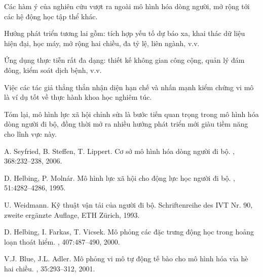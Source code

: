 \documentclass[12pt,a4paper]{article}
\begin{document}
Các hàm ý của nghiên cứu vượt ra ngoài mô hình hóa dòng người, mở rộng tới các hệ động học tập thể khác.

Hướng phát triển tương lai gồm: tích hợp yếu tố dự báo xa, khai thác dữ liệu hiện đại, học máy, mở rộng hai chiều, đa tỷ lệ, liên ngành, v.v.

Ứng dụng thực tiễn rất đa dạng: thiết kế không gian công cộng, quản lý đám đông, kiểm soát dịch bệnh, v.v.

Việc các tác giả thẳng thắn nhận diện hạn chế và nhấn mạnh kiểm chứng vi mô là ví dụ tốt về thực hành khoa học nghiêm túc.

Tóm lại, mô hình lực xã hội chỉnh sửa là bước tiến quan trọng trong mô hình hóa dòng người đi bộ, đồng thời mở ra nhiều hướng phát triển mới giàu tiềm năng cho lĩnh vực này.


\begin{thebibliography}{99}

A. Seyfried, B. Steffen, T. Lippert.
\newblock Cơ sở mô hình hóa dòng người đi bộ.
, 368:232--238, 2006.

D. Helbing, P. Molnár.
\newblock Mô hình lực xã hội cho động lực học người đi bộ.
, 51:4282--4286, 1995.

U. Weidmann.
\newblock Kỹ thuật vận tải của người đi bộ.
\newblock Schriftenreihe des IVT Nr. 90, zweite ergänzte Auflage, ETH Zürich, 1993.

D. Helbing, I. Farkas, T. Vicsek.
\newblock Mô phỏng các đặc trưng động học trong hoảng loạn thoát hiểm.
, 407:487--490, 2000.

V.J. Blue, J.L. Adler.
\newblock Mô phỏng vi mô tự động tế bào cho mô hình hóa vỉa hè hai chiều.
, 35:293--312, 2001.

\end{thebibliography}
\end{document}
